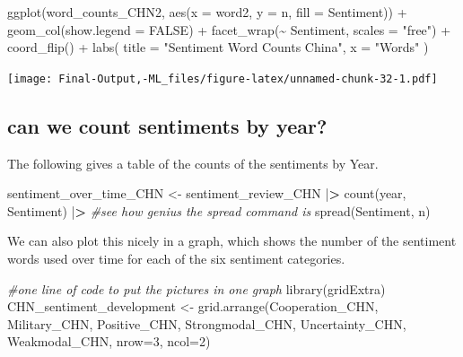 \documentclass[
]{article}
\newenvironment{Shaded}{\begin{snugshade}}{\end{snugshade}}
\newcommand{\AttributeTok}[1]{\textcolor[rgb]{0.77,0.63,0.00}{#1}}
\newcommand{\CommentTok}[1]{\textcolor[rgb]{0.56,0.35,0.01}{\textit{#1}}}
\newcommand{\ConstantTok}[1]{\textcolor[rgb]{0.00,0.00,0.00}{#1}}
\newcommand{\DecValTok}[1]{\textcolor[rgb]{0.00,0.00,0.81}{#1}}
\newcommand{\ErrorTok}[1]{\textcolor[rgb]{0.64,0.00,0.00}{\textbf{#1}}}
\newcommand{\FunctionTok}[1]{\textcolor[rgb]{0.00,0.00,0.00}{#1}}
\newcommand{\NormalTok}[1]{#1}
\newcommand{\OtherTok}[1]{\textcolor[rgb]{0.56,0.35,0.01}{#1}}
\newcommand{\SpecialCharTok}[1]{\textcolor[rgb]{0.00,0.00,0.00}{#1}}
\newcommand{\StringTok}[1]{\textcolor[rgb]{0.31,0.60,0.02}{#1}}
\begin{document}
\begin{Shaded}
\begin{Highlighting}[]
\FunctionTok{ggplot}\NormalTok{(word\_counts\_CHN2, }\FunctionTok{aes}\NormalTok{(}\AttributeTok{x =}\NormalTok{ word2, }\AttributeTok{y =}\NormalTok{ n, }\AttributeTok{fill =}\NormalTok{ Sentiment)) }\SpecialCharTok{+} 
  \FunctionTok{geom\_col}\NormalTok{(}\AttributeTok{show.legend =} \ConstantTok{FALSE}\NormalTok{) }\SpecialCharTok{+} 
  \FunctionTok{facet\_wrap}\NormalTok{(}\SpecialCharTok{\textasciitilde{}}\NormalTok{ Sentiment, }\AttributeTok{scales =} \StringTok{"free"}\NormalTok{) }\SpecialCharTok{+} 
  \FunctionTok{coord\_flip}\NormalTok{() }\SpecialCharTok{+} 
  \FunctionTok{labs}\NormalTok{( }
    \AttributeTok{title =} \StringTok{"Sentiment Word Counts China"}\NormalTok{, }
    \AttributeTok{x =} \StringTok{"Words"} 
\NormalTok{  )}
\end{Highlighting}
\end{Shaded}

\texttt{[image: Final-Output,-ML\_files/figure-latex/unnamed-chunk-32-1.pdf]}

\hypertarget{can-we-count-sentiments-by-year}{%
\subsection{can we count sentiments by
year?}\label{can-we-count-sentiments-by-year}}

The following gives a table of the counts of the sentiments by Year.

\begin{Shaded}
\begin{Highlighting}[]
\NormalTok{sentiment\_over\_time\_CHN }\OtherTok{\textless{}{-}}\NormalTok{ sentiment\_review\_CHN }\SpecialCharTok{|}\ErrorTok{\textgreater{}} 
    \FunctionTok{count}\NormalTok{(year, Sentiment) }\SpecialCharTok{|}\ErrorTok{\textgreater{}}  \CommentTok{\#see how genius the spread command is}
    \FunctionTok{spread}\NormalTok{(Sentiment, n) }
\end{Highlighting}
\end{Shaded}

We can also plot this nicely in a graph, which shows the number of the
sentiment words used over time for each of the six sentiment categories.

\begin{Shaded}
\begin{Highlighting}[]
\CommentTok{\#one line of code to put the pictures in one graph}
\FunctionTok{library}\NormalTok{(gridExtra)}
\NormalTok{CHN\_sentiment\_development }\OtherTok{\textless{}{-}} \FunctionTok{grid.arrange}\NormalTok{(Cooperation\_CHN, Military\_CHN, Positive\_CHN, Strongmodal\_CHN, Uncertainty\_CHN, Weakmodal\_CHN, }\AttributeTok{nrow=}\DecValTok{3}\NormalTok{, }\AttributeTok{ncol=}\DecValTok{2}\NormalTok{)}
\end{Highlighting}
\end{Shaded}
\end{document}
